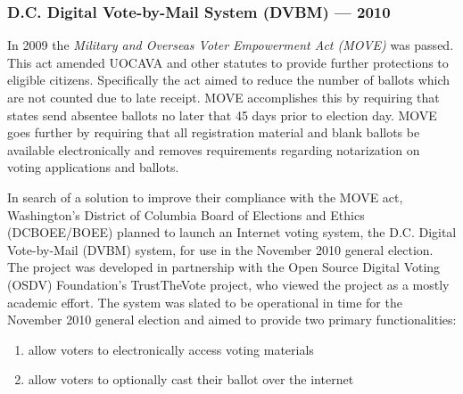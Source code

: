 
\subsubsection{D.C. Digital Vote-by-Mail System (DVBM) --- 2010}

In 2009 the \emph{Military and Overseas Voter Empowerment Act (MOVE)} was
passed. This act amended UOCAVA and other statutes to provide further protections
to eligible citizens. Specifically the act aimed to reduce the number of ballots
which are not counted due to late receipt. MOVE accomplishes this by requiring
that states send absentee ballots no later that 45 days prior to election day.
MOVE goes further by requiring that all registration material and blank ballots
be available electronically and removes requirements regarding notarization on
voting applications and ballots.\cite{MOVE}


In search of a solution to improve their compliance with the MOVE act,
Washington's District of Columbia Board of Elections and Ethics (DCBOEE/BOEE)
planned to launch an Internet voting system, the D.C. Digital Vote-by-Mail
(DVBM) system, for use in the November 2010 general election. The project was
developed in partnership with the Open Source Digital Voting (OSDV) Foundation's
TrustTheVote project, who viewed the project as a mostly academic
effort.\cite{trust-the-vote-dc-pilot} The system was slated to be operational in
time for the November 2010 general election and aimed to provide two primary
functionalities:\cite{internet-voting-survey,dc-voting-system}
\begin{enumerate}
  \item allow voters to electronically access voting materials
  \item allow voters to optionally cast their ballot over the internet
\end{enumerate}

